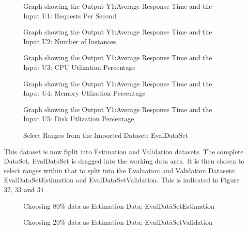 \documentclass[article,type=msc,colorback,12pt,accentcolor=tud7b,table]{tudthesis}
\begin{document}
\begin{figure}[H]
	\begin{center}
		\makebox[\textwidth]{\texttt{[image: E17]}}
	\end{center}
	\caption{Graph showing the Output Y1:Average Response Time and the Input U1: Requests Per Second}
	\begin{center}
		\makebox[\textwidth]{\texttt{[image: E18]}}
		\end{center}
	\caption{Graph showing the Output Y1:Average Response Time and the Input U2: Number of Instances}
\end{figure}

\begin{figure}[H]
	\begin{center}
		\makebox[\textwidth]{\texttt{[image: E19]}}
	\end{center}
	\caption{Graph showing the Output Y1:Average Response Time and the Input U3: CPU Utlization Percentage}
	\begin{center}
		\makebox[\textwidth]{\texttt{[image: E20]}}
	\end{center}
	\caption{Graph showing the Output Y1:Average Response Time and the Input U4: Memory Utlization Percentage}
\end{figure}

\begin{figure}[H]
	\begin{center}
		\makebox[\textwidth]{\texttt{[image: E21]}}
	\end{center}
	\caption{Graph showing the Output Y1:Average Response Time and the Input U5: Disk Utlization Percentage}
  	\begin{center}
  		\makebox[\textwidth]{\texttt{[image: E7]}}
  	\end{center}
  	\caption{Select Ranges from the Imported Dataset: EvalDataSet}
\end{figure}
	
This dataset is now Split into Estimation and Validation datasets. The complete DataSet, EvalDataSet is dragged into the working data area. It is then chosen to select ranges within that to 	split into the Evaluation and Validation Datasets: EvalDataSetEstimation and EvalDataSetValidation. This is indicated in Figure 32, 33 and 34
  \begin{figure}[H]
	  	  	  	\begin{center}
	  	  	  		\makebox[\textwidth]{\texttt{[image: E8]}}
	  	  	  	\end{center}
	  	  	  	\caption{Choosing 80\% data as Estimation Data: EvalDataSetEstimation}

    	\begin{center}
    		\makebox[\textwidth]{\texttt{[image: E9]}}
    	\end{center}
    	\caption{Choosing 20\% data as Estimation Data: EvalDataSetValidation}
    \end{figure}	
	
\end{document}
